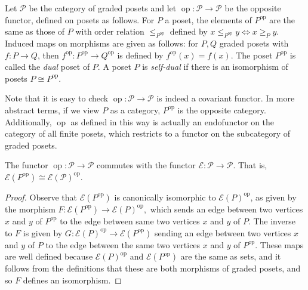\documentclass[smallextended, envcountsame, numbook]{svjour3}
\numberwithin{equation}{section}
\renewcommand{\iff}{\Leftrightarrow}
\newcommand\op{\operatorname{op}}
\begin{document}
\begin{definition}
Let $\mathcal P$ be the category of graded posets and let $\op\colon\mathcal P \rightarrow \mathcal P$ be the opposite functor, defined on posets as follows. For $P$ a poset, the elements of $P^{\op}$ are the same as those of $P$ with order relation $\le_{P^{\op}}$ defined by $x \leq_{P^{\op}} y \iff x \geq_P y$. Induced maps on morphisms are given as follows: for $P,Q$ graded posets with $f\colon P \rightarrow Q$, then $f^{\op}\colon P^{\op} \rightarrow Q^{\op}$ is defined by $f^{\op}(x) = f(x)$. The poset $P^{\op}$ is called the {\it dual} poset of $P$. A poset $P$ is {\it self-dual} if there is an isomorphism of posets $P \cong P^{\op}$.
\end{definition}

\begin{remark}
Note that it is easy to check $\op\colon\mathcal P \rightarrow \mathcal P$ is indeed a covariant functor. In more abstract terms, if we view $P$ as a category, $P^{\op}$ is the opposite category. Additionally, $\op$ as defined in this way is actually an endofunctor on the category of all finite posets, which restricts to a functor on the subcategory of graded posets.
\end{remark}

\begin{lemma}
\label{lem:commuting_op_e}
The functor $\op\colon\mathcal P \rightarrow \mathcal P$ commutes with the functor $\mathcal E\colon\mathcal P \rightarrow \mathcal P$. That is, $\mathcal E(P^{\op}) \cong \mathcal E(\mathcal P)^{\op}$.
\end{lemma}
\begin{proof}
	Observe that $\mathcal E(P^{\op})$ is canonically isomorphic to $\mathcal E(P)^{\op}$, as given by the morphism $F\colon\mathcal E(P^{\op}) \rightarrow \mathcal E(P)^{\op},$ which sends an edge between two vertices $x$ and $y$ of $P^{\op}$ to the edge between same two vertices $x$ and $y$ of $P$. The inverse to $F$ is given by $G\colon\mathcal E(P)^{\op} \rightarrow \mathcal E(P^{\op})$ sending an edge between two vertices $x$ and $y$ of $P$ to the edge between the same two vertices $x$ and $y$ of $P^{\op}$. These maps are well defined because $\mathcal E(P)^{\op}$ and $\mathcal E(P^{\op})$ are the same as sets, and it follows from the definitions that these are both morphisms of graded posets, and so $F$ defines an isomorphism.
\end{proof}
\end{document}
